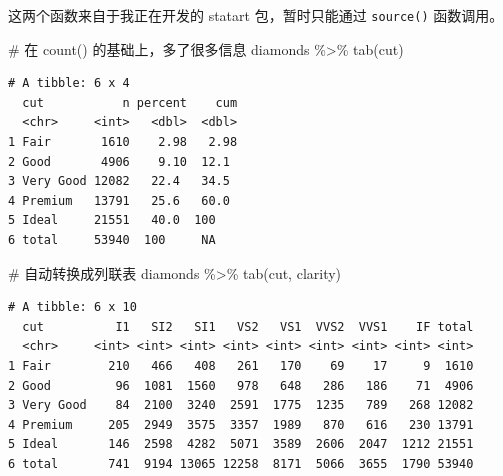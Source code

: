 \documentclass[
  letterpaper,
]{ctexbook}
\newenvironment{Shaded}{\begin{snugshade}}{\end{snugshade}}
\newcommand{\CommentTok}[1]{\textcolor[rgb]{0.37,0.37,0.37}{#1}}
\newcommand{\FunctionTok}[1]{\textcolor[rgb]{0.28,0.35,0.67}{#1}}
\newcommand{\NormalTok}[1]{\textcolor[rgb]{0.00,0.23,0.31}{#1}}
\newcommand{\SpecialCharTok}[1]{\textcolor[rgb]{0.37,0.37,0.37}{#1}}
\begin{document}
\begin{tcolorbox}[enhanced jigsaw, bottomtitle=1mm, bottomrule=.15mm, coltitle=black, title=\textcolor{quarto-callout-caution-color}{\faFire}\hspace{0.5em}{注意}, toptitle=1mm, colframe=quarto-callout-caution-color-frame, colbacktitle=quarto-callout-caution-color!10!white, opacitybacktitle=0.6, arc=.35mm, opacityback=0, breakable, toprule=.15mm, left=2mm, titlerule=0mm, rightrule=.15mm, colback=white, leftrule=.75mm]

这两个函数来自于我正在开发的 statart 包，暂时只能通过 \texttt{source()}
函数调用。

\end{tcolorbox}

\begin{Shaded}
\begin{Highlighting}[]
\CommentTok{\# 在 count() 的基础上，多了很多信息}
\NormalTok{diamonds }\SpecialCharTok{\%\textgreater{}\%}
  \FunctionTok{tab}\NormalTok{(cut)}
\end{Highlighting}
\end{Shaded}

\begin{verbatim}
# A tibble: 6 x 4
  cut           n percent    cum
  <chr>     <int>   <dbl>  <dbl>
1 Fair       1610    2.98   2.98
2 Good       4906    9.10  12.1 
3 Very Good 12082   22.4   34.5 
4 Premium   13791   25.6   60.0 
5 Ideal     21551   40.0  100   
6 total     53940  100     NA   
\end{verbatim}

\begin{Shaded}
\begin{Highlighting}[]
\CommentTok{\# 自动转换成列联表}
\NormalTok{diamonds }\SpecialCharTok{\%\textgreater{}\%}
  \FunctionTok{tab}\NormalTok{(cut, clarity)}
\end{Highlighting}
\end{Shaded}

\begin{verbatim}
# A tibble: 6 x 10
  cut          I1   SI2   SI1   VS2   VS1  VVS2  VVS1    IF total
  <chr>     <int> <int> <int> <int> <int> <int> <int> <int> <int>
1 Fair        210   466   408   261   170    69    17     9  1610
2 Good         96  1081  1560   978   648   286   186    71  4906
3 Very Good    84  2100  3240  2591  1775  1235   789   268 12082
4 Premium     205  2949  3575  3357  1989   870   616   230 13791
5 Ideal       146  2598  4282  5071  3589  2606  2047  1212 21551
6 total       741  9194 13065 12258  8171  5066  3655  1790 53940
\end{verbatim}
\end{document}
